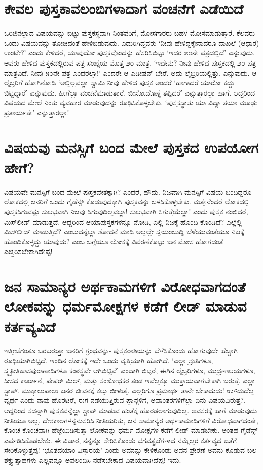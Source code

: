 \section*{ಕೇವಲ ಪುಸ್ತಕಾವಲಂಬಿಗಳಾದಾಗ ವಂಚನೆಗೆ ಎಡೆಯಿದೆ}

ಒರಿಜಿನಲ್ಲಾದ ವಿಷಯವನ್ನು ಬಿಟ್ಟು ಪುಸ್ತಕಸ್ಥವಾಗಿ ನಿಂತವರಿಗೆ, ಮೋಸಗಾರರು ಬಹಳ ಮೋಸಮಾಡುತ್ತಾರೆ. ಕೆಲವರು ಒಂದು ವಿಷಯವನ್ನು ತೋಚಿದಂತೆ ಹೇಳಿಬಿಡುವುದು. ಎದುರಿಗಿದ್ದವರು `ನೀವು ಹೇಳಿದ್ದಕ್ಕೇನಾದರೂ ದಾಖಲೆ (ಆಧಾರ) ಉಂಟೇ?' ಎಂದು ಕೇಳಿದರೆ, ಯಾವುದೋ ಪುಸ್ತಕವೊಂದನ್ನು ಹೆಸರಿಸಿಬಿಟ್ಟು `ಇದರ ೫೦ನೇ ಪತ್ರದಲ್ಲಿದೆ' ಎನ್ನುವುದು. ಅವರು ಹೇಳಿದ ಪುಸ್ತಕದಲ್ಲಿರುವ ಪತ್ರ ಸಂಖ್ಯೆಯ ಮೊತ್ತ ೨೦ ಮಾತ್ರ. `ಇದೇನು? ನೀವು ಹೇಳಿದ ಪುಸ್ತಕದಲ್ಲಿ ೨೦ ಪತ್ರ ಮಾತ್ರವಿದೆ. ನೀವು ೫೦ನೇ ಪತ್ರ ಎಂದರಲ್ಲಾ!' ಎಂದರೇ ಆ ಎಡೀಷನ್ ಬೇರೆ. ಅದು ಲೈಬ್ರರಿಯಲ್ಲಿತ್ತು, ಎನ್ನುವುದು. ಆ ಲೈಬ್ರರಿಗೆ ಹೋಗಿನೋಡಿ `ಅಲ್ಲಿಲ್ಲವಲ್ಲಾ ಸ್ವಾಮಿ ನೀವು ಹೇಳಿದ ಪುಸ್ತಕ ಅಂದರೆ `ಹಾಗಾದರೆ ಯಾರೋ ಕದ್ದು ಬಿಟ್ಟಿದ್ದಾರೆ' ಎನ್ನುವುದು. ಹೀಗೆಲ್ಲಾ ವಂಚನೆಮಾಡುತ್ತಾರೆ. ಬೀಸೋದೊಣ್ಣೆ ತಪ್ಪಿದರೆ' ಎನ್ನುತ್ತಾರಲ್ಲಾ ಹಾಗೆ. ಆದ್ದರಿಂದ ವಿಷಯದ ಮೇಲೆ ನಿಂತು ವ್ಯವಹಾರ ಮಾಡುವುದನ್ನು ರೂಢಿಸಿಕೊಳ್ಳಬೇಕು. `ಪುಸ್ತಕಸ್ಥಾತು ಯಾ ವಿದ್ಯಾ ತಯಾ ಮೂಢಃ ಪ್ರತಾರ್ಯತೇ' ಎನ್ನುತ್ತಾರಲ್ಲಾ!

\section*{ವಿಷಯವು ಮನಸ್ಸಿಗೆ ಬಂದ ಮೇಲೆ ಪುಸ್ತಕದ ಉಪಯೋಗ ಹೇಗೆ?}

ವಿಷಯವೇ ಮನಸ್ಸಿಗೆ ಬಂದ ಮೇಲೆ ಪುಸ್ತಕವೇತಕ್ಕಾಗಿ? ಎಂದರೆ, ಹೌದು. ನಿಜವಾಗಿ ಮನಸ್ಸಿಗೆ ವಿಷಯ ಬಂದಿದ್ದರೂ ಲೋಕದಲ್ಲಿ ಜನರಿಗೆ ಒಂದು ಗೈಡೆನ್ಸ್  ಕೊಡುವುದಕ್ಕಾಗಿ ಪುಸ್ತಕವನ್ನು ಬಳಸಿಕೊಳ್ಳಬೇಕು. ಮತ್ತೇನೆಂದರೆ ಲೋಕದಲ್ಲಿ ಪುಸ್ತಕಸಿಗುವಷ್ಟು ಸುಲಭವಾಗಿ ನಿಜವು ಸಿಗುವುದಿಲ್ಲವಲ್ಲಾ! ಸುಲಭವಾಗಿ ಸಿಗುತ್ತೆಯೆಲ್ಲಾ! ಎಂದು ಪುಸ್ತಕ ನಂಬಿದರೆ, ಮಿಸ್‌ಲೀಡ್ ಮಾಡುತ್ತದೆ. ಆದ್ದರಿಂದ ಆಯಾಪುಸ್ತಕಗಳನ್ನೂ ನೋಡಿ, ಎಲ್ಲಿ ನಿಜಕ್ಕೆ ಹೊಂದಿ ಕೊಂಡಿದೆ? ಎಲ್ಲೆಲ್ಲಿ ಮಿಸ್‌ಲೀಡ್ ಮಾಡುತ್ತಿದೆ? ಎಂಬುದನ್ನೆಲ್ಲಾ ಶೋಧನೆ ಮಾಡಿ ಅಲ್ಲಲ್ಲೇ ಸ್ವಯಂಬುದ್ದಿ ಬೆಳೆಯುವಂತೆಯೂ ನಿಜಕ್ಕೆ ಹೊಂದಿಕೊಳ್ಳದ್ದು ಯಾವುದು? ಎಂಬ ಬಗ್ಗೆಯೂ ಲೋಕಕ್ಕೆ ವಿವರಣೆಕೊಟ್ಟು ಜನ ಮೋಸ ಹೋಗದಂತೆ ಎಚ್ಚರಿಸಬೇಕಾಗಿದೇಪ್ಪ!

\section*{ಜನ ಸಾಮಾನ್ಯರ ಅರ್ಥಕಾಮಗಳಿಗೆ ವಿರೋಧವಾಗದಂತೆ ಲೋಕವನ್ನು ಧರ್ಮಮೋಕ್ಷಗಳ ಕಡೆಗೆ ಲೀಡ್ ಮಾಡುವ ಕರ್ತವ್ಯವಿದೆ}

ಇತ್ತೀಚೆಗಂತೂ ಬರಬರುತ್ತಾ ಜನರಿಗೆ ಗ್ರಂಥವನ್ನು- ಪುಸ್ತಕರಾಶಿಯನ್ನು ಬೆಳೆಸಿಕೊಂಡು ಹೋಗುವುದೇ ಹೆಚ್ಚಾಗಿ ರೂಢಿಯಾಗಿಬಿಟ್ಟಿದೆ. ಇಂದಿನ ಲೋಕಕ್ಕೆ ಇದೇ ಒಂದು  ವೃತ್ತಿಯಾಗಿ ಹೋಗಿದೆ. `ಎಲ್ಲಾ ಶ್ರುತಿಗಳೂ, ಸ್ಮೃತೀತಿಹಾಸಪುರಾಣಾದಿಗಳೂ ಕಂಠಸ್ಥವೇ ಆಗಿಬಿಟ್ಟಿವೆ' ಎಂದಾಗಿ ಬಿಟ್ಟರೆ, ಈಗಿನ ಲೈಬ್ರರಿಗಳೂ, ಮುದ್ರಣಾಲಯಗಳೂ, ಸೀಸದ ಕಾರ್ಖಾನೆ, ಪೇಪರ್ ಮಿಲ್, ಮತ್ತು ಸಂಶೋಧಕರ ತಂಡ ಇವೆಲ್ಲಕ್ಕೂ ಮುಕ್ತಾಯವಾಗಬೇಕಾಗಿ ಬರುತ್ತೆ. ಎಲ್ಲಾ ಸ್ಟಾಪ್. ಮುಕ್ಕಾಲುಪಾಲು ಜನರ ಜೀವನಕ್ಕೆ ಕಲ್ಲು ಬೀಳುತ್ತೆ. ಎಲ್ಲರಿಗೂ ಪ್ರಮಾರ್ಥ ತಾನೇ ಬೇಕಾದುದು! ಉಳಿದುದೆಲ್ಲ ವ್ಯರ್ಥ ಎಂದು ನಾವು ಹೊರಟರೆ, ಈಗ ನಡೆಯುತ್ತಿರುವ ಪ್ಲಾನ್ಗಳಿಗೆ, ಅವಾಂತರಗಳಿಗೆಲ್ಲಾ ಏನು ವಿಷಯವಿರುತ್ತೆ?. ಆದ್ದರಿಂದ ಸಡನ್ನಾಗಿ ಪುಸ್ತಕವನ್ನೆಲ್ಲಾ ಸ್ಟಾಪ್ ಮಾಡುವ ಹಂತೆಕ್ಕೆ ಹೊರಡಲಾಗುವುದಿಲ್ಲ. ಅವಸರಕ್ಕೆ ಹಾಗೆ ಮಾಡುವುದು ನೀತಿಯೂ ಅಲ್ಲ. ದೇಶಕಾಲಗಳನ್ನನುಸರಿಸಿ ನೀತಿಯರಿತು, ಜನ ಸಾಮಾನ್ಯರ ಅರ್ಥಕಾಮಾದಿಗಳಿಗೆ ವಿರೋಧವಾಗದಂತೇ, ಕೊಂಚ ಕೊಂಚವಾಗಿ ಹೆಜ್ಜೆಯಿಡಿಸುತ್ತಾ ಲೋಕವನ್ನು ಧರ್ಮ ಮೋಕ್ಷಗಳ ಕಡೆಗೆ ಲೀಡ್ ಮಾಡಬೇಕು. ಅಂತಹ ಗೈಡೆನ್ಸ್  ಎರ್ಪಡಿಸಿಕೊಡಬೇಕು. ಈ ವಿಚಾರ, ನನ್ನನ್ನೂ ಸೇರಿಸಿಕೊಂಡು ಭಗವತ್ಪ್ರಜೆಗಳಾದ ನಮ್ಮೆಲ್ಲರ ಕರ್ತವ್ಯದ ಜತೆಗೆ ಸೇರಿಕೊಳ್ಳುತ್ತೆಪ್ಪ! `ಭೂತದಯಾಂ ವಿಸ್ತಾರಯ' ಎಂದು ಅವನನ್ನು ಕೇಳಿಕೊಂಡು ಅವನ ಪ್ರೇರಣೆ ಅವನು ಕೊಡುವ ಬಲ ಶಕ್ತ್ಯುತ್ಸಾಹಗಳು ಎಲ್ಲವನ್ನೂ ಅವಲಂಬಿಸಿ ನಡೆಸಬೇಕಾದ ವಿಷಯವಾಗಿದೆಪ್ಪ! ಇದು.

